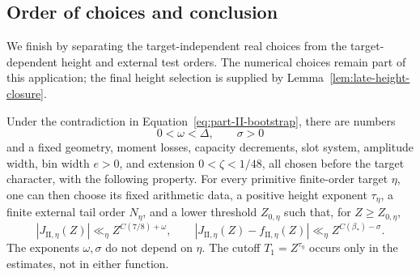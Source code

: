 \subsection{Order of choices and conclusion}

We finish by separating the target-independent real choices from the
target-dependent height and external test orders.  The numerical choices
remain part of this application; the final height selection is supplied by
Lemma~\ref{lem:late-height-closure}.

\begin{proposition}\label{prop:parameter-order}
Under the contradiction in Equation~\eqref{eq:part-II-bootstrap}, there
are numbers
\[
 0<\omega<\Delta,\qquad \sigma>0
\]
and a fixed geometry, moment losses, capacity decrements, slot system,
amplitude width, bin width \(e>0\), and extension \(0<\zeta<1/48\),
all chosen before the target character, with the following property.
For every primitive finite-order target \(\eta\), one can then choose
its fixed arithmetic data, a positive height exponent \(\tau_\eta\),
a finite external tail order \(N_\eta\), and a lower threshold
\(Z_{0,\eta}\) such that, for \(Z\ge Z_{0,\eta}\),
\[
 |J_{\mathrm{II},\eta}(Z)|\ll_\eta Z^{C(7/8)+\omega},\qquad
 |J_{\mathrm{II},\eta}(Z)-f_{\mathrm{II},\eta}(Z)|
 \ll_\eta Z^{C(\beta_*)-\sigma}.
\]
The exponents \(\omega,\sigma\) do not depend on \(\eta\).
The cutoff \(T_1=Z^{\tau_\eta}\) occurs only in the estimates,
not in either function.
\end{proposition}

